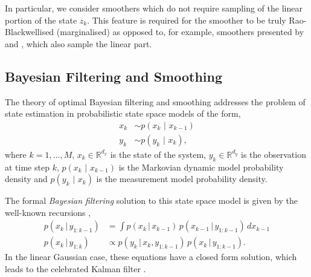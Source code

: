 \documentclass[twocolumn]{autart}    %
\begin{document}
In particular, we consider smoothers which do not require sampling of the linear portion of the state $z_k$. This feature is required for the smoother to be truly Rao-Blackwellised (marginalised) as opposed to, for example, smoothers presented by \cite{Fong+Godsill+Doucet+West:2002} and \cite{Lindsten+Schon:2011}, which also sample the linear part.

\subsection{Bayesian Filtering and Smoothing}
%
The theory of optimal Bayesian filtering and smoothing \cite{Ho+Lee:1964,Lee:1964} addresses the problem of state estimation in probabilistic state space models of the form,
%
\begin{equation}
\begin{split}
  x_k &\sim p(x_k \, \,|\, \, x_{k-1}) \\
  y_k &\sim p(y_k \, \,|\, \, x_{k}),
\end{split}
\label{eq:genmodel}
\end{equation}
%
where $k=1,\ldots,M$, $x_k \in \mathbb{R}^{d_x}$ is the state of the system, $y_k \in \mathbb{R}^{d_y}$ is the observation at time step $k$, $p(x_k \, \,|\, \, x_{k-1})$ is the Markovian dynamic model probability density and $p(y_k \, \,|\, \, x_{k})$ is the measurement model probability density.

The formal {\em Bayesian filtering} solution to this state space model is given by the well-known recursions \cite{Ho+Lee:1964},
%
\begin{equation}
\begin{split}
   p(x_k \,|\, y_{1:k-1})
   &= \int p(x_k \,|\, x_{k-1}) \, p(x_{k-1} \,|\, y_{1:k-1}) \, dx_{k-1} \\
   p(x_k \,|\, y_{1:k})
   &\propto
   p(y_k \,|\, x_k,y_{1:k-1}) \, p(x_k \,|\, y_{1:k-1}).
\end{split}
\label{eq:bfilter}
\end{equation}
%
In the linear Gaussian case, these equations have a closed form solution, which leads to the celebrated Kalman filter \cite{Kalman:1960}.
\end{document}

